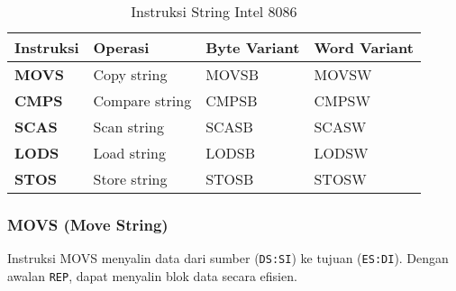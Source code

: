 \documentclass[../main.tex]{subfiles}
\begin{document}
            \begin{table}[H]
                \centering
                \caption{Instruksi String Intel 8086}
                \begin{tabular}{|p{2cm}|p{3cm}|p{4cm}|p{4cm}|}
                    \hline
                    \textbf{Instruksi} & \textbf{Operasi} & \textbf{Byte Variant} & \textbf{Word Variant} \\
                    \hline
                    \textbf{MOVS} & Copy string & MOVSB & MOVSW \\
                    \hline
                    \textbf{CMPS} & Compare string & CMPSB & CMPSW \\
                    \hline
                    \textbf{SCAS} & Scan string & SCASB & SCASW \\
                    \hline
                    \textbf{LODS} & Load string & LODSB & LODSW \\
                    \hline
                    \textbf{STOS} & Store string & STOSB & STOSW \\
                    \hline
                \end{tabular}
                \label{tab:string-instructions}
            \end{table}

            \subsubsection{MOVS (Move String)}
                Instruksi MOVS menyalin data dari sumber (\texttt{DS:SI}) ke tujuan (\texttt{ES:DI}). Dengan awalan \texttt{REP}, dapat menyalin blok data secara efisien.
\end{document}
